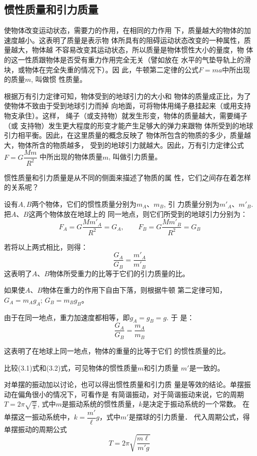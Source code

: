 \subsection{惯性质量和引力质量}
使物体改变运动状态，需要力的作用，在相同的力作用
下，质量越大的物体的加速度越小。这表明了质量是表示物
体所具有的阻碍运动状态改变的一种属性，质量越大，物体越
不容易改变其运动状态，所以质量是物体惯性大小的量度，物
体的这一性质跟物体是否受有重力作用完全无关（譬如放在
水平的气垫导轨上的滑块，或物体在完全失重的情况下）。因
此，牛顿第二定律的公式$F=ma$中所出现的质量$m$, 叫做惯
性质量。

根据万有引力定律可知，物体受到的地球引力的大小和
物体的质量成正比，为了使物体不致由于受到地球引力而掉
向地面，可将物体用绳子悬挂起来（或用支持物支承住）。这样，
绳子（或支持物）就发生形变，物体的质量越大，需要绳子（或
支持物）发生更大程度的形变才能产生足够大的弹力来跟物
体所受到的地球引力相平衡。因此，在这里质量的概念反映了
物体所包含的物质的多少，质量越大，物体所含的物质越多，
受到的地球引力就越大。因此，万有引力定律公式
$F=G\dfrac{Mm}{R^2}$
中所出现的物体质量$m$, 叫做引力质量。

惯性质量和引力质量是从不同的侧面来描述了物质的属
性，它们之间存在着怎样的关系呢？

设有$A,B$两个物体，它们的惯性质量分别为$m_A$、$m_B$, 引
力质量分别为$m'_A$、$m'_B$. 把$A$、$B$这两个物体放在地球上的
同一地点，则它们所受到的地球引力分别为：
\[F_A=G\frac{Mm'_A}{R^2}=G_A,\qquad F_B=G\frac{Mm'_B}{R^2}=G_B\]

若将以上两式相比，则得：
\begin{equation}
    \frac{G_A}{G_B}=\frac{m'_A}{m'_B}
\end{equation}
这表明了$A$、$B$物体所受重力的比等于它们的引力质量的比。

如果使$A$、$B$物体在重力的作用下自由下落，则根据牛顿
第二定律可知，$G_A=m_Ag_A$; $G_B=m_Bg_B$。

由于在同一地点，重力加速度都相等，即$g_A=g_B=g$. 于
是：
\begin{equation}
    \frac{G_A}{G_B}=\frac{m_A}{m_B}
\end{equation}

这表明了在地球上同一地点，物体的重量的比等于它们
的惯性质量的比。

比较(3.1)式和(3.2)式，可见物体的惯性质量$m$和引力质量
$m'$是一致的。

对单摆的振动加以讨论，也可以得出惯性质量和引力质
量是等效的结论。单摆振动在偏角很小的情况下，可看作是
有简谐振动，对于简谐振动来说，它的周期$T=2\pi\sqrt{\frac{m}{k}}$, 
式中$m$是振动系统的惯性质量，$k$是决定于振动系统的一个常数。
在单摆这一振动系统中，$k=\dfrac{m'}{\ell}g$，式中$m'$是摆球的引力质量．
代入周期公式，得单摆振动的周期公式
\[T=2\pi\sqrt{\frac{m\ell}{m'g}}\]


